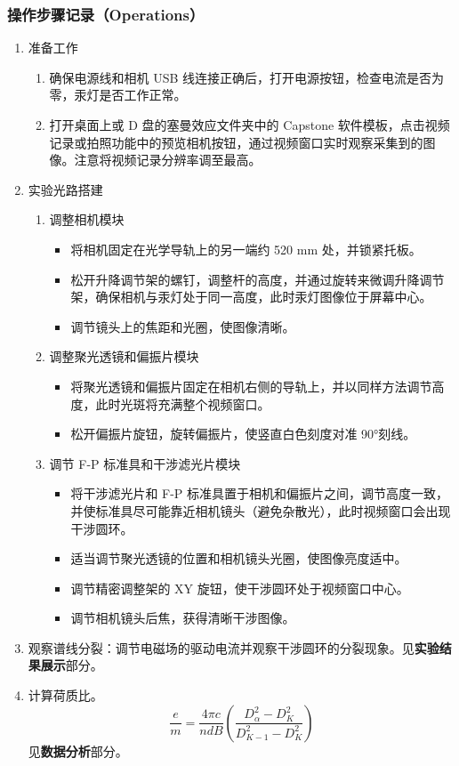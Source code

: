 \documentclass[dvipsnames, svgnames,a4paper,11pt]{article}
\begin{document}
	\subsubsection{操作步骤记录（Operations）}
	\begin{enumerate}
		\item 准备工作
		\begin{enumerate}
			\item 确保电源线和相机 USB 线连接正确后，打开电源按钮，检查电流是否为零，汞灯是否工作正常。
			
			\item 打开桌面上或 D 盘的塞曼效应文件夹中的 Capstone 软件模板，点击视频记录或拍照功能中的预览相机按钮，通过视频窗口实时观察采集到的图像。注意将视频记录分辨率调至最高。
		\end{enumerate}
		
		\item 实验光路搭建
		\begin{enumerate}
			\item 调整相机模块
			\begin{itemize}
				\item 将相机固定在光学导轨上的另一端约 520 mm 处，并锁紧托板。
				\item 松开升降调节架的螺钉，调整杆的高度，并通过旋转来微调升降调节架，确保相机与汞灯处于同一高度，此时汞灯图像位于屏幕中心。
				\item 调节镜头上的焦距和光圈，使图像清晰。
			\end{itemize}
						
			\item 调整聚光透镜和偏振片模块			
			\begin{itemize}
				\item 将聚光透镜和偏振片固定在相机右侧的导轨上，并以同样方法调节高度，此时光斑将充满整个视频窗口。
				\item 松开偏振片旋钮，旋转偏振片，使竖直白色刻度对准 90°刻线。
			\end{itemize}
			
			\item 调节 F-P 标准具和干涉滤光片模块			
			\begin{itemize}
				\item 将干涉滤光片和 F-P 标准具置于相机和偏振片之间，调节高度一致，并使标准具尽可能靠近相机镜头（避免杂散光），此时视频窗口会出现干涉圆环。
				\item 适当调节聚光透镜的位置和相机镜头光圈，使图像亮度适中。
				\item 调节精密调整架的 XY 旋钮，使干涉圆环处于视频窗口中心。
				\item 调节相机镜头后焦，获得清晰干涉图像。
			\end{itemize}
		\end{enumerate}
		
		\item 观察谱线分裂：调节电磁场的驱动电流并观察干涉圆环的分裂现象。见\textbf{实验结果展示}部分。
		
		\item 计算荷质比。
		\[
		\frac{e}{m} = \frac{4\pi c}{n d B}(\frac{D^2_\alpha - D^2_K}{D^2_{K-1} - D^2_{K}})
		\]
		见\textbf{数据分析}部分。
		
	\end{enumerate}	
	
\end{document}
